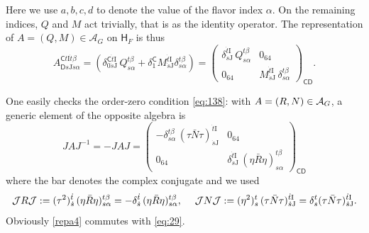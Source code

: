\documentclass[11pt]{article}
\newcommand{\sI}{\mathrm  I}
\newcommand{\sJ}{\mathrm J}
\newcommand{\sC}{\mathsf C}
\newcommand{\sD}{\mathsf D}
\begin{document}
Here we use $a,b,c,d$ to denote the value of the flavor
index $\alpha$.  On the remaining indices, $Q$ and $M$ act trivially,
that is as the
identity operator. The representation of  $A=(Q,M)\in{\mathcal A}_G$
on $\mathsf H_F$ is thus
\begin{equation}
A^{\sC t\sI \dot t \beta}_{\sD  s \sJ \dot s \alpha} = \left(
\delta^{\sC \dot t\sI}_{0  \dot s\sJ} \,Q^{ t \beta}_{ s \alpha}
+
\delta^\sC_1 M^{\dot t\sI}_{\dot s\sJ}\delta_{s\alpha}^{t\beta}\right) 
=\left(
\begin{array}{cc} \delta^{\dot t\sI}_{\dot s\sJ} \,Q^{t \beta}_{s
    \alpha} & 0_{64}\\ 0_{64} &  M^{\dot t\sI}_{\dot s\sJ}\, \delta_{s\alpha}^{t\beta}\end{array}\right)_{\sC\sD}. 
\label{repa4}
\end{equation}

One easily checks the order-zero condition \eqref{eq:138}: with
$A=(R, N)\in {\cal A}_G$, a generic element of the opposite algebra is
\begin{equation}
  \label{eq:29}
  J A J^{-1}= -J  A J=  \left(\begin{array}{cc}
-\delta_{s\alpha}^{t\beta} \, (\tau\bar
   N\tau)_{\dot s\sJ}^{\dot t\sI}& 0_{64}\\
0_{64} & \delta_{\dot s\sJ}^{\dot t\sI}\, (\eta \bar R\eta)_{s\alpha}^{ t \beta}
\end{array}\right)_{\sC\sD}
\end{equation}
where the bar denotes the complex conjugate and we used
\begin{equation}
   \label{eq:31}
 {\cal J} R {\cal J} := (\tau^2)_{\dot s}^{\dot t} \, (\eta \bar
 R\eta)_{s\alpha}^{ t \beta} = - \delta_{\dot s}^{\dot t}\, (\eta \bar R\eta)_{s\alpha}^{ t \beta} ,\; \quad
 {\cal J} N {\cal J} : = (\eta^2)_s^t\,(\tau\bar
   N\tau)_{\dot s\sJ}^{\dot t\sI}= \delta_s^t (\tau\bar
   N\tau)_{\dot s\sJ}^{\dot t\sI}.
 \end{equation}
Obviously \eqref{repa4} commutes with \eqref{eq:29}.
\end{document}

